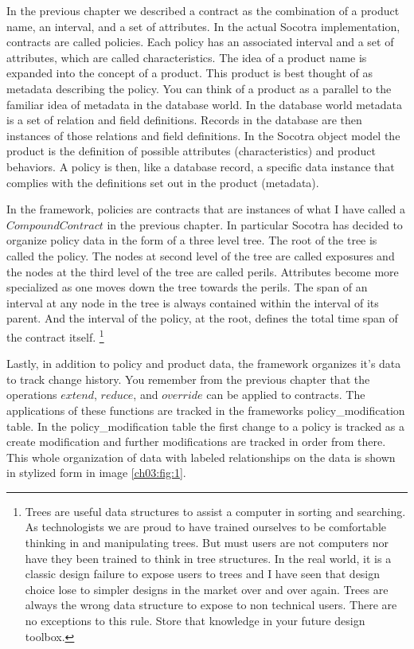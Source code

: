 In the previous chapter we described a contract as the combination of a product name, an interval, and a set of attributes.
In the actual Socotra implementation, contracts are called policies. Each policy has an associated interval and a set of attributes,
which are called characteristics. The idea of a product name is expanded into the concept of a product. This product is
best thought of as metadata describing the policy. You can think of a product as a parallel to the familiar idea of metadata in the
database world. In the database world metadata is a set of relation and field definitions. Records in the database are then instances
of those relations and field definitions. In the Socotra object model the product is the definition of possible attributes (characteristics)
and product behaviors. A policy is then, like a database record, a specific data instance that complies with the definitions set out in
the product (metadata).

In the framework, policies are contracts that are instances of what I have called a $CompoundContract$ in the previous chapter. In
particular Socotra has decided to organize policy data in the form of a three level tree. The root of the tree is called the
policy. The nodes at second level of the tree are called exposures and the nodes at the third level of the tree are called perils.
Attributes become more specialized as one moves down the tree towards the perils. The span of an interval at any node in the tree
is always contained within the interval of its parent. And the interval of the policy, at the root, defines the total time span of
the contract itself. \footnote {Trees are useful data structures to assist a computer in sorting and searching. As technologists
  we are proud to have trained ourselves to be comfortable thinking in and manipulating trees. But must users are not computers
  nor have they been trained to think in tree structures. In the real world, it is a classic design failure to expose users to trees
  and I have seen that design choice lose to simpler designs in the market over and over again. Trees are always the wrong data structure to expose
  to non technical users. There are no exceptions to this rule. Store that knowledge in your future design toolbox.}

Lastly, in addition to policy and product data, the framework organizes it's data to track change history. You remember from the previous
chapter that the operations $extend$, $reduce$, and $override$ can be applied to contracts. The applications of these functions are
tracked in the frameworks policy\_modification table. In the policy\_modification table the first change to a policy is tracked
as a create modification and further modifications are tracked in order from there. This whole organization of data with labeled
relationships on the data is shown in stylized form in image \ref{ch03:fig:1}.

